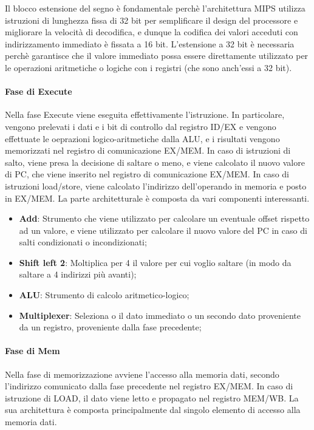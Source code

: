 Il blocco estensione del segno è fondamentale perchè l'architettura MIPS utilizza istruzioni di lunghezza fissa di 32 bit per semplificare il design del processore e migliorare la velocità di decodifica, e dunque la codifica dei valori acceduti con indirizzamento immediato è fissata a 16 bit. L'estensione a 32 bit è necessaria perchè garantisce che il valore immediato possa essere direttamente utilizzato per le operazioni aritmetiche o logiche con i registri (che sono anch'essi a 32 bit).

\paragraph{Fase di Execute}
Nella fase Execute viene eseguita effettivamente l'istruzione. In particolare, vengono prelevati i dati e i bit di controllo dal registro ID/EX e vengono effettuate le oeprazioni logico-aritmetiche dalla ALU, e i risultati vengono memorizzati nel registro di comunicazione EX/MEM. In caso di istruzioni di salto, viene presa la decisione di saltare o meno, e viene calcolato il nuovo valore di PC, che viene inserito nel registro di comunicazione EX/MEM. In caso di istruzioni load/store, viene calcolato l'indirizzo dell'operando in memoria e posto in EX/MEM. 
La parte architetturale è composta da vari componenti interessanti.
\begin{itemize}
    \item \textbf{Add}: Strumento che viene utilizzato per calcolare un eventuale offset rispetto ad un valore, e viene utilizzato per calcolare il nuovo valore del PC in caso di salti condizionati o incondizionati;
    \item \textbf{Shift left 2}: Moltiplica per 4 il valore per cui voglio saltare (in modo da saltare a 4 indirizzi più avanti);
    \item \textbf{ALU}: Strumento di calcolo aritmetico-logico;
    \item \textbf{Multiplexer}: Seleziona o il dato immediato o un secondo dato proveniente da un registro, proveniente dalla fase precedente;
\end{itemize}

\paragraph{Fase di Mem}
Nella fase di memorizzazione avviene l'accesso alla memoria dati, secondo l'indirizzo comunicato dalla fase precedente nel registro EX/MEM. In caso di istruzione di LOAD, il dato viene letto e propagato nel registro MEM/WB. 
La sua architettura è composta principalmente dal singolo elemento di accesso alla memoria dati.

